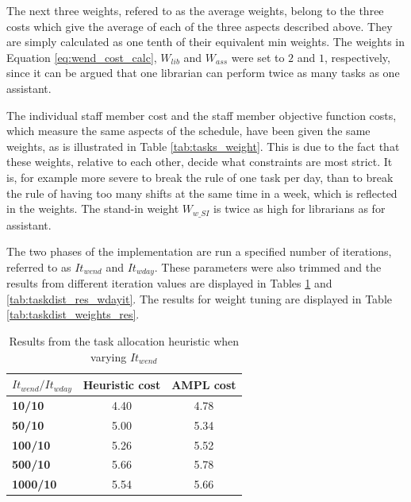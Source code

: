 The next three weights, refered to as the average weights, belong to the three costs which give the average of each of the three aspects described above. They are simply calculated as one tenth of their equivalent min weights. The weights in Equation \ref{eq:wend_cost_calc}, $W_{lib}$ and $W_{ass}$ were set to $2$ and $1$, respectively, since it can be argued that one librarian can perform twice as many tasks as one assistant.

The individual staff member cost and the staff member objective function costs, which measure the same aspects of the schedule, have been given the same weights, as is illustrated in Table \ref{tab:tasks_weight}. This is due to the fact that these weights, relative to each other, decide what constraints are most strict. It is, for example more severe to break the rule of one task per day, than to break the rule of having too many shifts at the same time in a week, which is reflected in the weights. The stand-in weight $W_{w\_SI}$ is twice as high for librarians as for assistant.

The two phases of the implementation are run a specified number of iterations, referred to as $It_{wend}$ and $It_{wday}$. These parameters were also trimmed and the results from different iteration values are displayed in Tables \ref{tab:taskdist_res_wendit} and \ref{tab:taskdist_res_wdayit}. The results for weight tuning are displayed in Table \ref{tab:taskdist_weights_res}.

\begin{table}[!h]
\centering
\caption{Results from the task allocation heuristic when varying $It_{wend}$}
\label{tab:taskdist_res_wendit}
\begin{tabular}{|l|l|l|}
\hline
\rowcolor{Gray} \textbf{$It_{wend}/It_{wday}$} &  \textbf{Heuristic cost} &  \textbf{AMPL cost} \\ \hline
\cellcolor{Gray} \textbf{10/10} & \multicolumn{1}{c|}{4.40} & \multicolumn{1}{c|}{4.78} \\
\cellcolor{Gray} \textbf{50/10} & \multicolumn{1}{c|}{5.00} & \multicolumn{1}{c|}{5.34} \\
\cellcolor{Gray} \textbf{100/10} & \multicolumn{1}{c|}{5.26} & \multicolumn{1}{c|}{5.52} \\
\cellcolor{Gray} \textbf{500/10} & \multicolumn{1}{c|}{5.66} & \multicolumn{1}{c|}{5.78} \\
\cellcolor{Gray} \textbf{1000/10} & \multicolumn{1}{c|}{5.54} & \multicolumn{1}{c|}{5.66}  \\
\hline
\end{tabular}
\end{table}

